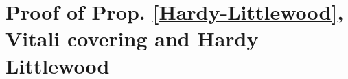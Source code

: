 {%



\chapter{Proof of Prop. \ref{Hardy-Littlewood}, Vitali covering and Hardy Littlewood}
\label{sec-hlm}


}
